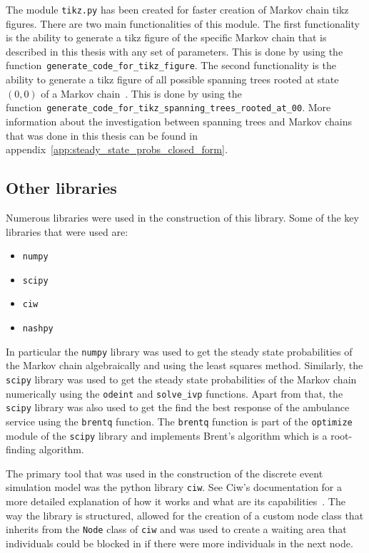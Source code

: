 The module \texttt{tikz.py} has been created for faster creation of
Markov chain tikz figures.
There are two main functionalities of this module.
The first functionality is the ability to generate a tikz figure of the
specific Markov chain that is described in this thesis with any set of
parameters.
This is done by using the function~\texttt{generate\_code\_for\_tikz\_figure}.
The second functionality is the ability to generate a tikz figure of all
possible spanning trees rooted at state \((0, 0)\) of a Markov
chain~\cite{sung2016enumeration, levine2011sandpile}.
This is done by using the
function~\texttt{generate\_code\_for\_tikz\_spanning\_trees\_rooted\_at\_00}.
More information about the investigation between spanning trees and Markov
chains that was done in this thesis can be found in
appendix~\ref{app:steady_state_probs_closed_form}.


\subsection{Other libraries}

Numerous libraries were used in the construction of this library.
Some of the key libraries that were used are:

\begin{itemize}
    \item \texttt{numpy}~\cite{2020NumPy-Array}
    \item \texttt{scipy}~\cite{2020SciPy-NMeth}
    \item \texttt{ciw}~\cite{ciwpython}
    \item \texttt{nashpy}~\cite{thenashpyproject}
\end{itemize}

In particular the \texttt{numpy} library was used to get the steady state
probabilities of the Markov chain algebraically and using the least squares
method.
Similarly, the \texttt{scipy} library was used to get the steady state
probabilities of the Markov chain numerically using the \texttt{odeint} and
\texttt{solve\_ivp} functions.
Apart from that, the \texttt{scipy} library was also used to get the find
the best response of the ambulance service using the \texttt{brentq} function.
The \texttt{brentq} function is part of the \texttt{optimize} module of the
\texttt{scipy} library and implements Brent's algorithm which is a
root-finding algorithm.

The primary tool that was used in the construction of the discrete event
simulation model was the python library \texttt{ciw}.
See Ciw's documentation for a more detailed explanation of how it works and
what are its capabilities~\cite{ciwpython}.
The way the library is structured, allowed for the creation of a custom
node class that inherits from the \texttt{Node} class of \texttt{ciw} and
was used to create a waiting area that individuals could be blocked in if
there were more individuals in the next node.

